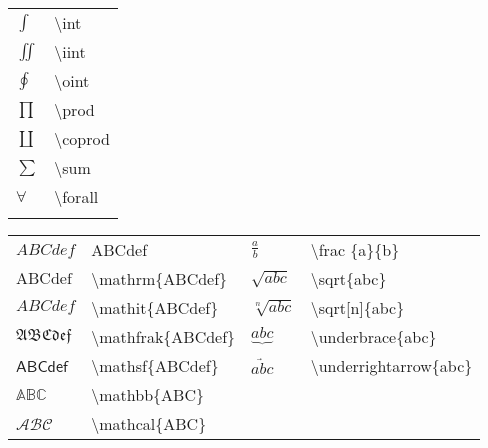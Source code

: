 \documentclass[14pt,a4paper]{extarticle}
\begin{document}
\begin{table}
\begin{subtable}{.24\textwidth}
\begin{tabular}{ p{1em} p{9em}  }
      \\ 
    \end{tabular}
  \end{subtable}
  \begin{subtable}{.24\textwidth}
    \begin{tabular}{ p{1em} p{9em}  }

      $\int$ & \textbackslash int \\
      $\iint$ & \textbackslash iint \\
      $\oint$ & \textbackslash oint \\
      $\prod$ & \textbackslash prod \\
      $\coprod$ & \textbackslash coprod \\
      $\sum$ & \textbackslash sum \\
      $\forall$ & \textbackslash forall \\
      \\ 

    \end{tabular}
  \end{subtable}
\end{table}
\begin{table}
  \centering
    \begin{tabular}{ p{4em} p{12em} p{4em} p{12em} }
      $ABCdef$ & ABCdef &
      $\frac{a}{b}$ & \textbackslash frac \{a\}\{b\} \\
      $\mathrm{ABCdef}$ & \textbackslash mathrm\{ABCdef\} &
      $\sqrt{abc}$ & \textbackslash sqrt\{abc\} \\
      $\mathit{ABCdef}$ & \textbackslash mathit\{ABCdef\} &
      $\sqrt[n]{abc}$ & \textbackslash sqrt[n]\{abc\} \\
      $\mathfrak{ABCdef}$ & \textbackslash mathfrak\{ABCdef\} &
      $\underbrace{abc}$ & \textbackslash underbrace\{abc\} \\
      $\mathsf{ABCdef}$ & \textbackslash mathsf\{ABCdef\} &
      $\underrightarrow{abc}$ & \textbackslash underrightarrow\{abc\} \\

      $\mathbb{ABC}$ & \textbackslash mathbb\{ABC\} \\
      $\mathcal{ABC}$ & \textbackslash mathcal\{ABC\} \\

   \end{tabular}
\end{table}
\end{document}
